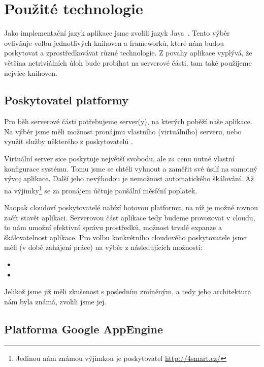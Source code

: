 \chapter{Použité technologie}

Jako implementační jazyk aplikace jsme zvolili jazyk Java~\cite{gosling05java-langspec-3}.
Tento výběr ovlivňuje volbu jednotlivých knihoven a frameworků, které nám budou poskytovat a zprostředkovávat různé technologie.
Z povahy aplikace vyplývá, že většina netriviálních úloh bude probíhat na serverové části, tam také použijeme nejvíce knihoven.

\section{Poskytovatel platformy}
Pro běh serverové části potřebujeme server(y), na kterých poběží naše aplikace.
Na výběr jsme měli možnost pronájmu vlastního (virtuálního) serveru, nebo využít služby některého z poskytovatelů .

Virtuální server sice poskytuje největší svobodu, ale za cenu nutné vlastní konfigurace systému.
Tomu jsme se chtěli vyhnout a zaměřit své úsilí na samotný vývoj aplikace.
Další jeho nevýhodou je nemožnost automatického škálování.
Až na výjimky\footnote{Jedinou nám známou výjimkou je poskytovatel \url{http://4smart.cz/}} se za pronájem účtuje paušální měsíční poplatek.

Naopak cloudoví poskytovatelé nabízí hotovou platformu, na níž je možné rovnou začít stavět aplikaci.
Serverovou část aplikace tedy budeme provozovat v cloudu, to nám umožní efektivní správu prostředků, možnost trvalé expanze a škálovatelnost aplikace.
Pro volbu konkrétního cloudového poskytovatele jsme měli (v době zahájení práce) na výběr z následujících možností:
\begin{itemize}
	\item {}
	\item {}
\end{itemize}

Jelikož jsme již měli zkušenost s posledním zmíněným, a tedy jeho architektura nám byla známá, zvolili jsme jej.

\section{Platforma Google AppEngine}

